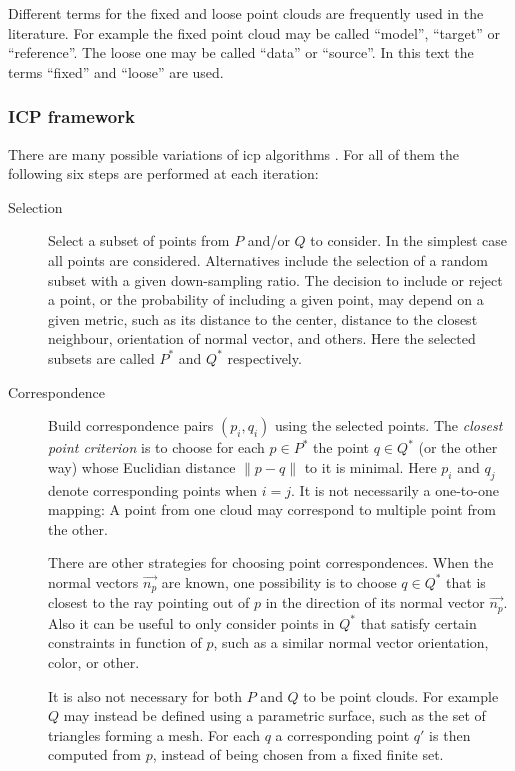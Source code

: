 Different terms for the fixed and loose point clouds are frequently used in the literature. For example the fixed point cloud may be called ``model'', ``target'' or ``reference''. The loose one may be called ``data'' or ``source''. In this text the terms ``fixed'' and ``loose'' are used.

\subsubsection{ICP framework}
There are many possible variations of \gls{icp} algorithms \cite{Rusi2001}. For all of them the following six steps are performed at each iteration:
\begin{description}
\item[Selection] Select a subset of points from $P$ and/or $Q$ to consider. In the simplest case all points are considered. Alternatives include the selection of a random subset with a given down-sampling ratio. The decision to include or reject a point, or the probability of including a given point, may depend on a given metric, such as its distance to the center, distance to the closest neighbour, orientation of normal vector, and others. Here the selected subsets are called $P^*$ and $Q^*$ respectively.
\item[Correspondence] Build correspondence pairs $(p_i, q_i)$ using the selected points. The \emph{closest point criterion} is to choose for each $p \in P^*$ the point $q \in Q^*$ (or the other way) whose Euclidian distance $\|p - q\|$ to it is minimal. Here $p_i$ and $q_j$ denote corresponding points when $i = j$. It is not necessarily a one-to-one mapping: A point from one cloud may correspond to multiple point from the other.

There are other strategies for choosing point correspondences. When the normal vectors $\vec{n_p}$ are known, one possibility is to choose $q \in Q^*$ that is closest to the ray pointing out of $p$ in the direction of its normal vector $\vec{n_p}$. Also it can be useful to only consider points in $Q^*$ that satisfy certain constraints in function of $p$, such as a similar normal vector orientation, color, or other.

It is also not necessary for both $P$ and $Q$ to be point clouds. For example $Q$ may instead be defined using a parametric surface, such as the set of triangles forming a mesh. For each $q$ a corresponding point $q'$ is then computed from $p$, instead of being chosen from a fixed finite set.


\end{description}
